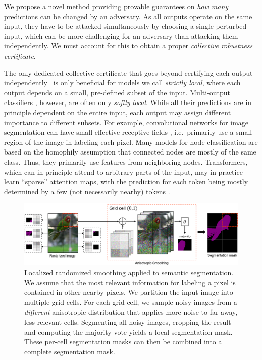 \documentclass{article} %
\theoremstyle{plain}
\theoremstyle{definition}
\theoremstyle{remark}
\begin{document}
We propose a novel method providing provable guarantees on \textit{how many} predictions can be changed by an adversary.
As all outputs operate on the same input, they have to be attacked simultaneously by choosing a single perturbed input,
which can be more challenging for an adversary than attacking them independently.
We must account for this to obtain a proper \textit{collective robustness certificate}.

The only dedicated collective certificate that goes beyond certifying each output independently~\citep{Schuchardt2021} is only beneficial for models we call \textit{strictly local}, where each output depends  on a small, pre-defined subset of the input. 
Multi-output classifiers
, however, are often only \textit{softly local}.
While all
their predictions are in principle dependent on the entire input, each output may assign different importance to different subsets.
For example, convolutional networks for image segmentation can have small effective receptive fields \citep{Luo2016,Liu2018}, i.e.\ primarily use a small region of the image in labeling each pixel.
Many models for node classification are based on the homophily assumption that connected nodes are mostly of the same class. Thus, they primarily use features from neighboring nodes.
Transformers, which can in principle attend to arbitrary parts of the input, may in practice learn ``sparse'' attention maps, with the prediction for each token being mostly determined by a few (not necessarily nearby) tokens \citep{Shi2021}.
\begin{figure}
	\centering
	\includegraphics[width=\columnwidth]{figures/main_figure_new.png}
	\caption{Localized randomized smoothing applied to semantic segmentation.
		We assume that the most relevant information for labeling a pixel is contained in other nearby pixels.
		We partition the input image into multiple grid cells.
		For each grid cell, we sample noisy images from a \textit{different} anisotropic distribution that applies more noise to far-away, less relevant 
		cells.
		Segmenting all noisy images, cropping the result and computing the majority vote %
		yields a local segmentation mask.
		These per-cell segmentation masks can then be combined into a complete segmentation mask.}
	\label{fig:main_figure}
	\vskip-0.2in
\end{figure}
\end{document}
